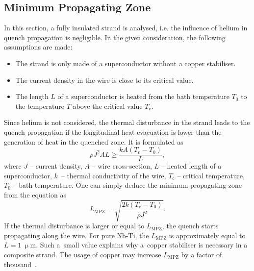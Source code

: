 \subsection{Minimum Propagating Zone}

In this section, a fully insulated strand is analysed, i.e. the influence of helium in quench propagation is negligible. In the given consideration, the following assumptions are made: 
\begin{itemize}
    \item The strand is only made of a superconductor without a copper stabiliser. 
    \item The current density in the wire is close to its critical value. 
    \item The length $L$ of a superconductor is heated from the bath temperature $T_0$ to the temperature $T$ above the critical value $T_\text{c}$.
\end{itemize}

Since helium is not considered, the thermal disturbance in the strand leads to the quench propagation if the longitudinal heat evacuation is lower than the generation of heat in the quenched zone. It is formulated as
\begin{equation}
    \rho J^2 A L \geq \frac{kA(T_\text{c}-T_0)}{L},
\end{equation}
where $J$ -- current density, $A$ -- wire cross-section, $L$ -- heated length of a superconductor, $k$~-- thermal conductivity of the wire, $T_\text{c}$ -- critical temperature, $T_0$ -- bath temperature. One can simply deduce the minimum propagating zone from the equation as
\begin{equation}
    L_\text{MPZ} = \sqrt{\frac{2k(T_\text{c}-T_0)}{\rho J^2}}.
\end{equation}
If the thermal disturbance is larger or equal to $L_\text{MPZ}$, the quench starts propagating along the wire. For pure Nb-Ti, the $L_\text{MPZ}$ is approximately equal to $L=1~\upmu \text{m}$. Such a~small value explains why a~copper stabiliser is necessary in a composite strand. The usage of copper may increase $L_\text{MPZ}$ by a factor of thousand~\cite[p.~124]{superconducting_accelerator_magnets}. 
